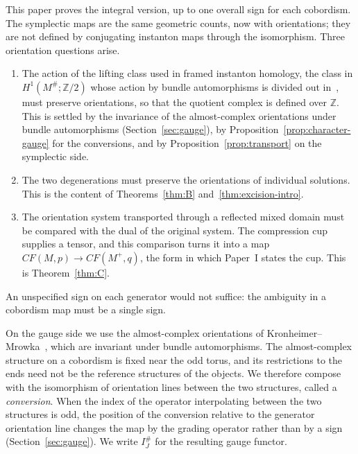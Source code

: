 \documentclass[11pt]{amsart}
\theoremstyle{definition}
\theoremstyle{remark}
\theoremstyle{plain}
\numberwithin{equation}{section}
\newcommand{\ZZ}{\mathbb Z}
\newcommand{\CF}{\mathit{CF}}
\newcommand{\IG}{I^{\#}_{J}}
\begin{document}
This paper proves the integral version, up to one overall sign for each cobordism. The symplectic
maps are the same geometric counts, now with orientations; they are not defined by conjugating
instanton maps through the isomorphism. Three orientation questions arise.
\begin{enumerate}[label=(\roman*)]
\item The action of the lifting class used in framed instanton homology, the class in $H^1(M^\#;\ZZ/2)$ whose action by bundle automorphisms is divided out in~\cite[Section~5.1]{KM-unknot}, must preserve orientations, so that the quotient complex is defined over $\ZZ$. This is settled by the invariance of the almost-complex orientations under bundle automorphisms (Section~\ref{sec:gauge}), by Proposition~\ref{prop:character-gauge} for the conversions, and by Proposition~\ref{prop:transport} on the symplectic side.
\item The two degenerations must preserve the orientations of individual solutions. This is the
content of Theorems~\ref{thm:B} and~\ref{thm:excision-intro}.
\item The orientation system transported through a reflected mixed domain must be compared with
the dual of the original system. The compression cup supplies a tensor, and this comparison turns it into a map $\CF(M,p)\to\CF(M^+,q)$, the form in which Paper~I states the cup. This is Theorem~\ref{thm:C}.
\end{enumerate}
An unspecified sign on each generator would not suffice: the ambiguity in a cobordism map must be a
single sign.

On the gauge side we use the almost-complex orientations of
Kronheimer--Mrowka~\cite[Section~5.1]{KM-unknot}, which are invariant under bundle automorphisms.
The almost-complex structure on a cobordism is fixed near the odd torus, and its restrictions to the
ends need not be the reference structures of the objects. We therefore compose with the
isomorphism of orientation lines between the two structures, called a \emph{conversion}. When the index of the operator interpolating between the two structures is odd, the position of the conversion relative to the generator orientation line changes the map by the grading operator rather than by a sign (Section~\ref{sec:gauge}). We write $\IG$ for
the resulting gauge functor.
\end{document}
